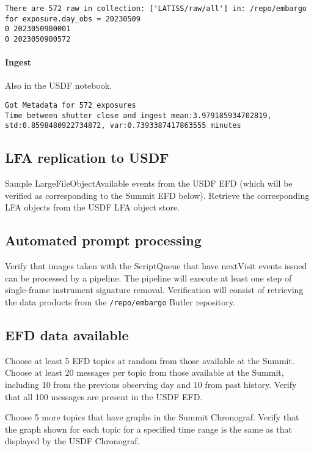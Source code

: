 \begin{verbatim}
There are 572 raw in collection: ['LATISS/raw/all'] in: /repo/embargo for exposure.day_obs = 20230509
0 2023050900001
0 2023050900572
\end{verbatim}

\paragraph {Ingest}
Also in the USDF notebook.
\begin{verbatim}
Got Metadata for 572 exposures
Time between shutter close and ingest mean:3.979185934702819, std:0.8598480922734872, var:0.7393387417863555 minutes
\end{verbatim}

\subsection{LFA replication to USDF }
Sample LargeFileObjectAvailable events from the USDF EFD (which will be verified as corresponding to the Summit EFD below).
Retrieve the corresponding LFA objects from the USDF LFA object store.

\subsection{Automated prompt processing}
Verify that images taken with the ScriptQueue that have nextVisit events issued can be processed by a pipeline.
The pipeline will execute at least one step of single-frame instrument signature removal.
Verification will consist of retrieving the data products from the \texttt{/repo/embargo} Butler repository.

\subsection{EFD data available }
Choose at least 5 EFD topics at random from those available at the Summit.
Choose at least 20 messages per topic from those available at the Summit, including 10 from the previous observing day and 10 from past history.
Verify that all 100 messages are present in the USDF EFD.

Choose 5 more topics that have graphs in the Summit Chronograf.
Verify that the graph shown for each topic for a specified time range is the same as that displayed by the USDF Chronograf.
